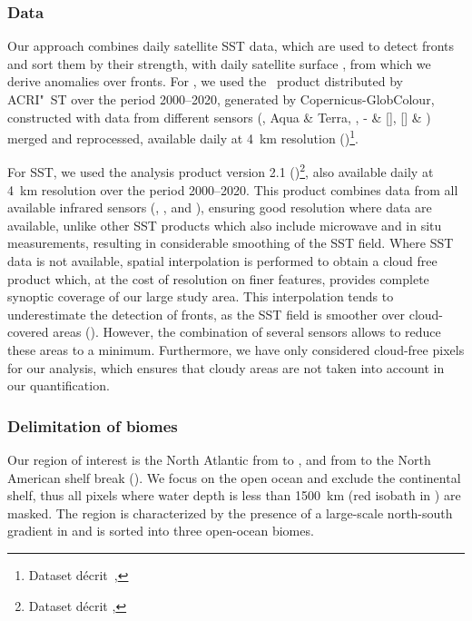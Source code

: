 \subsubsection{Data}

Our approach combines daily satellite SST data, which are used to detect fronts and sort them by their strength, with daily satellite surface , from which we derive anomalies over fronts.
For , we used the ~product distributed by ACRI"~ST over the period 2000--2020, generated by Copernicus-GlobColour, constructed with data from different sensors (,  Aqua \& Terra, , - \& [], [] \& ) merged and reprocessed, available daily at \qty{4}{\km} resolution (\cite{garnesson_2019})\footnote{Dataset  décrit~, }.

For SST, we used the    analysis product version 2.1 (\cite{merchant_2019, good_2020})\footnote{Dataset  décrit , }, also available daily at \qty{4}{\km} resolution over the period 2000--2020.
This product combines data from all available infrared sensors (, , and ), ensuring good resolution where data are available, unlike other SST products which also include microwave and in situ measurements, resulting in considerable smoothing of the SST field. %
Where SST data is not available, spatial interpolation is performed to obtain a cloud free product which, at the cost of resolution on finer features, provides complete synoptic coverage of our large study area.
This interpolation tends to underestimate the detection of fronts, as the SST field is smoother over cloud-covered areas (\cite{merchant_2019}).
However, the combination of several sensors allows to reduce these areas to a minimum.
Furthermore, we have only considered cloud-free pixels for our analysis, which ensures that cloudy areas are not taken into account in our quantification.


\subsubsection{Delimitation of biomes}

Our region of interest is the North Atlantic from  to , and from  to the North American shelf break ().
We focus on the open ocean and exclude the continental shelf, thus all pixels where water depth is less than \qty{1500}{\km} (red isobath in ) are masked.
The region is characterized by the presence of a large-scale north-south gradient in  and is sorted into three open-ocean biomes.

